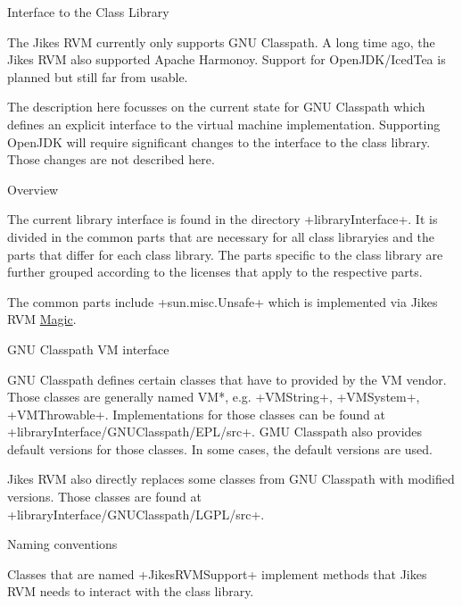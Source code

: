 \begin{chapter}{Interface to the Class Library}
\label{cha:classlibraryinterface}

The Jikes RVM currently only supports GNU Classpath. A long time ago, the Jikes RVM also supported Apache Harmonoy. Support for OpenJDK/IcedTea is planned but still far from usable.

The description here focusses on the current state for GNU Classpath which defines an explicit interface to the virtual machine implementation. Supporting OpenJDK will require significant changes to the interface to the class library. Those changes are not described here.

\begin{section}{Overview}

The current library interface is found in the directory \spverb+libraryInterface+. It is divided in the common parts that are necessary for all class libraryies and the parts that differ for each class library. The parts specific to the class library are further grouped according to the licenses that apply to the respective parts.

The common parts include \spverb+sun.misc.Unsafe+ which is implemented via Jikes RVM \hyperref[cha:magic]{Magic}.

\end{section}

\begin{section}{GNU Classpath VM interface}

GNU Classpath defines certain classes that have to provided by the VM vendor. Those classes are generally named VM*, e.g. \spverb+VMString+, \spverb+VMSystem+, \spverb+VMThrowable+. Implementations for those classes can be found at \newline \spverb+libraryInterface/GNUClasspath/EPL/src+. GMU Classpath also provides default versions for those classes. In some cases, the default versions are used.

Jikes RVM also directly replaces some classes from GNU Classpath with modified versions. Those classes are found at \newline \spverb+libraryInterface/GNUClasspath/LGPL/src+.

\end{section}

\begin{section}{Naming conventions}

Classes that are named \spverb+JikesRVMSupport+ implement methods that Jikes RVM needs to interact with the class library.


\end{section}
\end{chapter}
